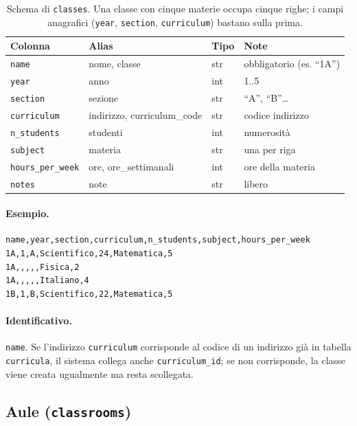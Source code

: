 \begin{table}[h]
\centering\small
\begin{tabular}{l l l p{4.6cm}}
\toprule
\textbf{Colonna} & \textbf{Alias} & \textbf{Tipo} & \textbf{Note} \\
\midrule
\texttt{name} & nome, classe & str & obbligatorio (es. ``1A'') \\
\texttt{year} & anno & int & 1..5 \\
\texttt{section} & sezione & str & ``A'', ``B''\dots \\
\texttt{curriculum} & indirizzo, curriculum\_code & str & codice indirizzo \\
\texttt{n\_students} & studenti & int & numerosit\`a \\
\texttt{subject} & materia & str & una per riga \\
\texttt{hours\_per\_week} & ore, ore\_settimanali & int & ore della materia \\
\texttt{notes} & note & str & libero \\
\bottomrule
\end{tabular}
\caption{Schema di \texttt{classes}. Una classe con cinque materie
occupa cinque righe; i campi anagrafici (\texttt{year},
\texttt{section}, \texttt{curriculum}) bastano sulla prima.}
\label{tab:formato_classes}
\end{table}

\paragraph{Esempio.}
\begin{lstlisting}
name,year,section,curriculum,n_students,subject,hours_per_week
1A,1,A,Scientifico,24,Matematica,5
1A,,,,,Fisica,2
1A,,,,,Italiano,4
1B,1,B,Scientifico,22,Matematica,5
\end{lstlisting}

\paragraph{Identificativo.} \texttt{name}. Se l'indirizzo
\texttt{curriculum} corrisponde al codice di un indirizzo gi\`a in
tabella \texttt{curricula}, il sistema collega anche
\texttt{curriculum\_id}; se non corrisponde, la classe viene creata
ugualmente ma resta scollegata.

\subsection{Aule (\texttt{classrooms})}

